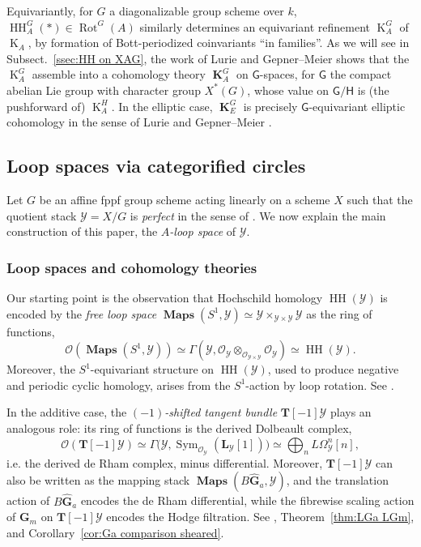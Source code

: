 \documentclass[12pt, oneside]{amsart}
\numberwithin{equation}{section}
\theoremstyle{remark}
\theoremstyle{plain}
\DeclareMathOperator{\MAP}{\mathbf{Maps}}
\newcommand{\OO}{\mathcal{O}}
\newcommand{\YY}{\mathcal{Y}}
\newcommand{\GGhat}{\widehat{\mathbf{G}}}
\newcommand{\GGm}{\mathbf{G}_{m}}
\newcommand{\TT}{\mathbf{T}}
\newcommand{\HH}{\operatorname{HH}}
\newcommand{\K}{\operatorname{K}}
\newcommand{\Kcoh}{\operatorname{\mathbf{K}}}
\newcommand{\LL}{\mathbf{L}}
\DeclareMathOperator{\Sym}{Sym}
\newcommand{\Rot}{\operatorname{Rot}}
\begin{document}
Equivariantly, for $G$ a diagonalizable group scheme over $k$, $\HH_A^G(*) \in \Rot^G(A)$ similarly determines an equivariant refinement $\K_A^G$ of $\K_A$, by formation of Bott-periodized coinvariants ``in families''.
As we will see in Subsect.~\ref{ssec:HH on XAG}, the work of Lurie and Gepner--Meier \cite{LurieEllSurv,GepMei} shows that the $\K_A^G$ assemble into a cohomology theory $\Kcoh_A^G$ on $\mathsf{G}$-spaces, for $\mathsf{G}$ the compact abelian Lie group with character group $X^*(G)$, whose value on $\mathsf{G}/\mathsf{H}$ is (the pushforward of) $\K_A^H$.
In the elliptic case, $\Kcoh_E^G$ is precisely $\mathsf{G}$-equivariant elliptic cohomology in the sense of Lurie and Gepner--Meier \cite{LurieEllSurv,GepMei}.

\subsection{Loop spaces via categorified circles}\label{ssec:intro/circles}

Let $G$ be an affine fppf group scheme acting linearly on a scheme $X$ such that the quotient stack $\YY=X/G$ is \emph{perfect} in the sense of \cite{BFN}.
We now explain the main construction of this paper, the \emph{$A$-loop space} of $\YY$.

\subsubsection{Loop spaces and cohomology theories}

Our starting point is the observation that Hochschild homology $\operatorname{HH}(\YY)$ is encoded by the \emph{free loop space} $\MAP(S^1, \YY) \simeq \YY \times_{\YY \times \YY} \YY$ as the ring of functions,
\[
  \OO(\MAP(S^1, \YY)) \simeq
  \Gamma(\YY, \OO_\YY \otimes_{\OO_{\YY \times \YY}} \OO_\YY) \simeq
  \operatorname{HH}(\YY).
\]
Moreover, the $S^1$-equivariant structure on $\operatorname{HH}(\YY)$, used to produce negative and periodic cyclic homology, arises from the $S^1$-action by loop rotation.
See \cite{BNloop,TVChern}.

In the additive case, the \emph{$(-1)$-shifted tangent bundle} $\TT[-1]\YY$ plays an analogous role: its ring of functions is the derived Dolbeault complex,
\[ \OO(\TT[-1]\YY) \simeq \Gamma\bigl(\YY, \Sym_{\OO_\YY}(\LL_\YY[1])\bigr) \simeq \bigoplus_{n} L\Omega^n_\YY[n], \]
i.e. the derived de Rham complex, minus differential.
Moreover, $\TT[-1]\YY$ can also be written as the mapping stack $\MAP(B\GGhat_a, \YY)$, and the translation action of $B\GGhat_a$ encodes the de Rham differential, while the fibrewise scaling action of $\GGm$ on $\TT[-1]\YY$ encodes the Hodge filtration.
See \cite[Props.~4.4, 4.7, \S1.6.3]{BNloop}, Theorem~\ref{thm:LGa LGm}, and Corollary~\ref{cor:Ga comparison sheared}.
\end{document}
